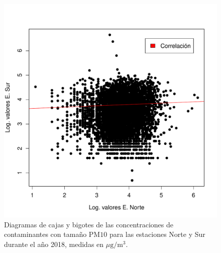 \documentclass[paper=leter, fontsize=11pt]{scrartcl}
\numberwithin{equation}{section}		%
\numberwithin{figure}{section}			%
\numberwithin{table}{section}				%
\begin{document}
\begin{figure}
    \centering
    \includegraphics[width=1\textwidth]{scatter.pdf}
    \caption{Diagramas de cajas y bigotes de las concentraciones de contaminantes con tamaño PM$10$ para las estaciones Norte y Sur durante el año 2018, medidas en $\mu\text{g}/\text{m}^3$.}
    \label{scatter}
\end{figure}



\end{document}

